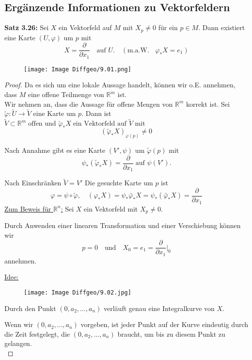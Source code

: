 \documentclass[fleqn, 12pt, letterpaper]{article}
\newcommand{\deldel}[2]{\frac{\partial #1}{\partial #2}}
\newcommand{\txt}[1]{\text{#1}}
\begin{document}
\subsection{Ergänzende Informationen zu Vektorfeldern}
\textbf{Satz 3.26:}
Sei $X$ ein Vektorfeld auf $M$ mit $X_p \neq 0$ für ein $p \in M$. Dann existiert eine Karte $(U, \varphi)$ um $p$ mit 
\[
X = \frac{\partial}{\partial x_1} \quad \text{auf } U. \quad (\text{m.a.W. } \;\; \varphi_\ast X = e_1)
\]
  \begin{figure}[H]
    \centering
    \texttt{[image: Image Diffgeo/9.01.png]}
 \end{figure}
\begin{proof}
    Da es sich um eine lokale Aussage handelt, können wir o.E. annehmen, dass $M$ eine offene Teilmenge von $\mathbb{R}^m$ ist. \\
Wir nehmen an, dass die Aussage für offene Mengen von $\mathbb{R}^m$ korrekt ist. Sei 
\(
\tilde{\varphi}: \tilde{U} \rightarrow \tilde{V}
\)
eine Karte um $p$. Dann ist 
\(
\tilde{V}\subset \mathbb{R}^m \;\txt{offen und }\tilde{\varphi}_*X\; \text{ein Vektorfeld auf } \tilde{V} \text{ mit } 
\)
\[(\tilde{\varphi}_*X)_{\varphi(p)}\neq 0\]

Nach Annahme gibt es eine Karte $(V', \psi)$ um $\tilde{\varphi}(p)$ mit 
\[
\psi_*(\tilde{\varphi}_*X)=\deldel{}{x_1}\; \text{auf } \psi(V').
\]

Nach Einschränken $\tilde{V} = V'$ Die gesuchte Karte um $p$ ist 
\[
\varphi = \psi \circ \tilde{\varphi}, \quad (\varphi_\ast X) = \psi_*\tilde{\varphi_*}X = \psi_*(\tilde{\varphi_*}X) = \deldel{}{x_1}
\]
\underline{Zum Beweis für $\mathbb{R}^n$:} Sei $X$ ein Vektorfeld mit $X_p \neq 0$.

Durch Anwenden einer linearen Transformation und einer Verschiebung können wir 
\[
p = 0 \quad \text{und} \quad X_0 = e_1 = \frac{\partial}{\partial x_1} \big|_0
\]
annehmen.

\underline{Idee:}
  \begin{figure}[H]
    \centering
    \texttt{[image: Image Diffgeo/9.02.jpg]}
 \end{figure}

\noindent
Durch den Punkt $(0, a_2, \dots, a_n)$ verläuft genau eine Integralkurve von $X$.

\vspace{1em}

\noindent
Wenn wir $(0, a_2, \dots, a_n)$ vorgeben, ist jeder Punkt auf der Kurve eindeutig durch die Zeit festgelegt, die $(0, a_2, \dots, a_n)$ braucht, um bis zu diesem Punkt zu gelangen.\\


\end{proof}
\end{document}
